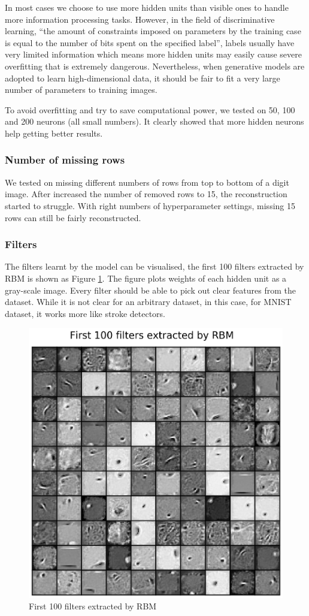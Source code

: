 \documentclass{article}
\begin{document}
In most cases we choose to use more hidden units than visible ones to handle more information processing tasks. However, in the field of discriminative learning, ``the amount of constraints imposed on parameters by the training case is equal to the number of bits spent on the specified label'', labels usually have very limited information which means more hidden units may easily cause severe overfitting that is extremely dangerous. Nevertheless, when generative models are adopted to learn high-dimensional data, it should be fair to fit a very large number of parameters to training images. 

To avoid overfitting and try to save computational power, we tested on 50, 100 and 200 neurons (all small numbers). It clearly showed that more hidden neurons help getting better results.

\subsubsection{Number of missing rows}
We tested on missing different numbers of rows from top to bottom of a digit image. After increased the number of removed rows to 15, the reconstruction started to struggle. With right numbers of hyperparameter settings, missing 15 rows can still be fairly reconstructed.

\subsubsection{Filters}
The filters learnt by the model can be visualised, the first 100 filters extracted by RBM is shown as Figure \ref{fig:first100rbm}. The figure plots weights of each hidden unit as a gray-scale image. Every filter should be able to pick out clear features from the dataset. While it is not clear for an arbitrary dataset, in this case, for MNIST dataset, it works more like stroke detectors.

\begin{figure}[h!]
  \centering
  \includegraphics[width=.4\textwidth]{lab4/rbmfinal100.pdf}
  \caption{First 100 filters extracted by RBM}
  \label{fig:first100rbm}
\end{figure}
\end{document}
